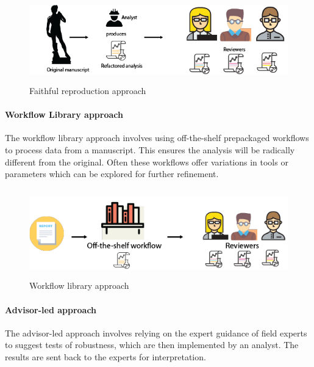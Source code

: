 \documentclass{drexelthesis}
\begin{document}
\begin{figure}[h!]
	\centering
	\includegraphics[width=13.76cm,height=3.66cm]{./images/faithful.png}
	\caption{Faithful reproduction approach}
	\label{faithful}
\end{figure}

\paragraph{Workflow Library approach}

The workflow library approach involves using off-the-shelf prepackaged workflows to process data from a manuscript. This ensures the analysis will be radically different from the original. Often these workflows offer variations in tools or parameters which can be explored for further refinement.


\begin{figure}[h!]
	\centering
	\includegraphics[width=13.68cm,height=3.84cm]{./images/workflow.png}
	\caption{Workflow library approach}
	\label{workflow}
\end{figure}


\paragraph{Advisor-led approach}

The advisor-led approach involves relying on the expert guidance of field experts to suggest tests of robustness, which are then implemented by an analyst. The results are sent back to the experts for interpretation.
\end{document}

